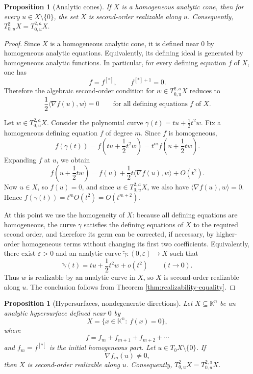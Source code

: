 \documentclass[10pt,reqno]{amsart}
\theoremstyle{break-italic}
\theoremstyle{break-italic}
\theoremstyle{break-italic}
\theoremstyle{break-italic}
\theoremstyle{break-italic}
\theoremstyle{break-italic}
\theoremstyle{break-italic}
\theoremstyle{break-italic}
\newtheorem{Proposition}[satz]{Proposition}
\theoremstyle{break-roman}
\theoremstyle{standard}
\theoremstyle{varthm-roman}
\theoremstyle{varthm-italic}
\theoremstyle{varthm-roman-break}
\theoremstyle{varthm-italic-break}
\theoremstyle{varthm-roman-no-punctuation}
\theoremstyle{varthm-italic-no-punctuation}
\numberwithin{equation}{section}
\begin{document}
\begin{Proposition}[Analytic cones]\label{prop:cone-realizable}
If $X$ is a homogeneous analytic cone, then for every $u\in X\setminus\{0\}$,
the set $X$ is second-order realizable along $u$. Consequently,
\(
T^2_{0,u}X=T^{2,a}_{0,u}X.
\)
\end{Proposition}

\begin{proof}
Since $X$ is a homogeneous analytic cone, it is defined near $0$ by homogeneous
analytic equations. Equivalently, its defining ideal is generated by homogeneous
analytic functions. In particular, for every defining equation $f$ of $X$, one
has
\[
f=f^{[\ast]},
\qquad
f^{[\ast]+1}=0.
\]
Therefore the algebraic second-order condition for $w\in T^{2,a}_{0,u}X$
reduces to
\[
\frac12 \langle \nabla f(u),w\rangle =0
\qquad \text{for all defining equations }f \text{ of }X.
\]

Let $w\in T^{2,a}_{0,u}X$. Consider the polynomial curve
\(
\gamma(t)=tu+\frac12 t^2w.
\)
Fix a homogeneous defining equation $f$ of degree $m$. Since $f$ is homogeneous,
\[
f(\gamma(t))
=
f\!\left(tu+\frac12 t^2w\right)
=
t^m f\!\left(u+\frac12 tw\right).
\]
Expanding $f$ at $u$, we obtain
\[
f\!\left(u+\frac12 tw\right)
=
f(u)+\frac12 t\langle \nabla f(u),w\rangle + O(t^2).
\]
Now $u\in X$, so $f(u)=0$, and since $w\in T^{2,a}_{0,u}X$, we also have
\(
\langle \nabla f(u),w\rangle =0.
\)
Hence
\(
f(\gamma(t))=t^m O(t^2)=O(t^{m+2}).
\)

At this point we use the homogeneity of $X$: because all defining equations are
homogeneous, the curve $\gamma$ satisfies the defining equations of $X$ to the
required second order, and therefore its germ can be corrected, if necessary, by
higher-order homogeneous terms without changing its first two coefficients.
Equivalently, there exist $\varepsilon>0$ and an analytic curve
\(
\widetilde{\gamma}:(0,\varepsilon)\to X
\)
such that
\[
\widetilde{\gamma}(t)=tu+\frac12 t^2w+o(t^2)
\qquad (t\to 0).
\]
Thus $w$ is realizable by an analytic curve in $X$, so $X$ is second-order
realizable along $u$. The conclusion follows from
Theorem \ref{thm:realizability-equality}.
\end{proof}

\begin{Proposition}[Hypersurfaces, nondegenerate directions]\label{prop:hypersurface-realizable}
Let $X\subseteq \mathbb K^n$ be an analytic hypersurface defined near $0$ by
\[
X=\{x\in \mathbb K^n:\ f(x)=0\},
\]
where
\[
f=f_m+f_{m+1}+f_{m+2}+\cdots
\]
and $f_m=f^{[\ast]}$ is the initial homogeneous part. Let
$u\in T_0X\setminus\{0\}$. If
\[
\nabla f_m(u)\ne 0,
\]
then $X$ is second-order realizable along $u$. Consequently,
\(
T^2_{0,u}X=T^{2,a}_{0,u}X.
\)
\end{Proposition}
\end{document}
